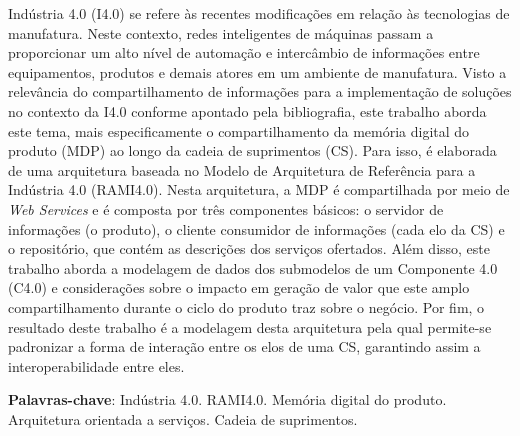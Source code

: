 \setlength{\absparsep}{18pt} %
\begin{resumo}
	Indústria 4.0 (I4.0) se refere às recentes modificações em relação às tecnologias de manufatura. Neste contexto, redes inteligentes de máquinas passam a proporcionar um alto nível de automação e intercâmbio de informações entre equipamentos, produtos e demais atores em um ambiente de manufatura. Visto a relevância do compartilhamento de informações para a implementação de soluções no contexto da I4.0 conforme apontado pela bibliografia, este trabalho aborda este tema, mais especificamente o compartilhamento da memória digital do produto (MDP) ao longo da cadeia de suprimentos (CS). Para isso, é elaborada de uma arquitetura baseada no Modelo de Arquitetura de Referência para a Indústria 4.0 (RAMI4.0). Nesta arquitetura, a MDP é compartilhada por meio de \textit{Web Services} e é composta por três componentes básicos: o servidor de informações (o produto), o cliente consumidor de informações (cada elo da CS) e o repositório, que contém as descrições dos serviços ofertados. Além disso, este trabalho aborda a modelagem de dados dos submodelos de um Componente 4.0 (C4.0) e considerações sobre o impacto em geração de valor que este amplo compartilhamento durante o ciclo do produto traz sobre o negócio. Por fim, o resultado deste trabalho é a modelagem desta arquitetura pela qual permite-se padronizar a forma de interação entre os elos de uma CS, garantindo assim a interoperabilidade entre eles.

	\vspace{\onelineskip}

	\noindent
	\textbf{Palavras-chave}: Indústria 4.0. RAMI4.0. Memória digital do produto. Arquitetura orientada a serviços. Cadeia de suprimentos.
\end{resumo}

